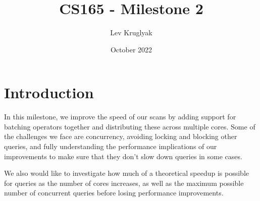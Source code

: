 \documentclass{article}
\title{\textbf{CS165 - Milestone 2}}
\author{Lev Kruglyak}
\date{October 2022}
\begin{document}
\maketitle

\section{Introduction}






In this milestone, we improve the speed of our scans by adding support for batching operators together and distributing these across multiple cores. Some of the challenges we face are concurrency, avoiding locking and blocking other queries, and fully understanding the performance implications of our improvements to make sure that they don't slow down queries in some cases.

\medskip
We also would like to investigate how much of a theoretical speedup is possible for queries as the number of cores increases, as well as the maximum possible number of concurrent queries before losing performance improvements.
\end{document}
